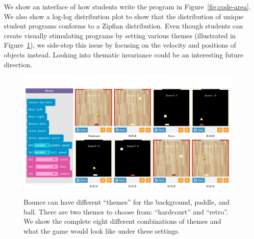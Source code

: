 \documentclass{article}
\begin{document}
We show an interface of how students write the program in Figure~\ref{fig:code-area}. We also show a log-log distribution plot to show that the distribution of unique student programs conforms to a Zipfian distribution. Even though students can create visually stimulating programs by setting various themes (illustrated in Figure~\ref{fig:theme-invars}), we side-step this issue by focusing on the velocity and positions of objects instead. Looking into thematic invariance could be an interesting future direction.

\begin{figure}[ht]
  \centering
  \includegraphics[width=0.85\linewidth]{images/thematic-invariance-new.pdf}
  \caption{Bounce can have different ``themes'' for the background, paddle, and ball. There are two themes to choose from: ``hardcourt'' and ``retro''. We show the complete eight different combinations of themes and what the game would look like under these settings.}
  \label{fig:theme-invars}
\end{figure}
\end{document}
